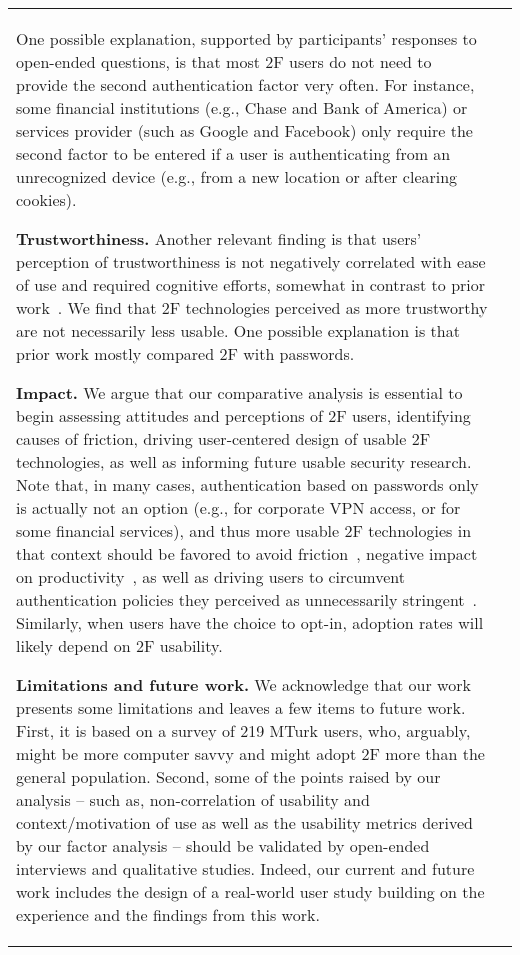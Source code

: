 \documentclass[conference]{IEEEtran}
\newcommand{\descr}[1]{\vspace{0.25cm} \noindent \textbf{#1}}
\begin{document}
\begin{table}[ttt]
\begin{tabular}{|l r|}
One possible explanation, supported by participants' responses to open-ended questions, is that 
most 2F users do not need to provide the second authentication factor very often. For instance, some financial institutions (e.g., Chase and Bank of America) or services provider (such as Google and Facebook) only require the second factor to be entered if a user is authenticating from an unrecognized device (e.g., from a new location or after clearing cookies).

\descr{Trustworthiness.} Another relevant finding is that users' perception of trustworthiness is not negatively correlated with ease of use and required cognitive efforts, somewhat in contrast to prior work~\cite{braz2006security,gunson2011user}. We find that 2F technologies perceived as more trustworthy are not necessarily less usable. One possible explanation is that prior work mostly compared 2F with passwords.


\descr{Impact.} We argue that our comparative analysis is essential to begin assessing attitudes and perceptions of 2F users, identifying causes of friction, driving user-centered design of usable 2F technologies, as well as informing future usable security research.
Note that, in many cases, authentication based on passwords only is actually not an option (e.g., for corporate VPN access, or for some financial services), and thus more usable 2F technologies in that context should be favored 
to avoid friction~\cite{adams1999users}, negative impact on productivity~\cite{strouble2009productivity,inglesant2010true}, as well as driving users to circumvent authentication policies they perceived as unnecessarily stringent~\cite{inglesant2010true}.
Similarly, when users have the choice to opt-in, adoption rates will likely depend on 2F usability. 



\descr{Limitations and future work.} We acknowledge that our work presents some limitations and leaves a few items to future work. First, it is based on a survey of 219 MTurk users, who, arguably, might be more computer savvy and might adopt 2F more than the general population. Second, some of the points raised by our analysis -- such as, non-correlation of usability and context/motivation of use as well as the usability metrics derived by our factor analysis -- should be validated by open-ended interviews and qualitative studies. Indeed, our current and future work includes the design of a real-world user study building on the experience and the findings from this work.



\end{tabular}
\end{table}
\end{document}
